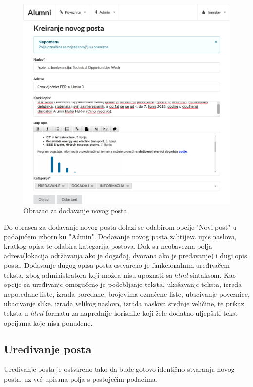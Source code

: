 \documentclass[zavrsni, numeric]{fer}
\begin{document}
\begin{figure}[H]
	\centering
	\includegraphics[width=13cm]{slike/novi-post.png}
	\caption{Obrazac za dodavanje novog posta}
	\label{fig:novi-post}
\end{figure}

Do obrasca za dodavanje novog posta dolazi se odabirom opcije "Novi post" u padajućem izborniku "Admin". Dodavanje novog posta zahtijeva upis naslova, kratkog opisa te odabira kategorija postova. Dok su neobavezna polja adresa(lokacija održavanja ako je događaj, dvorana ako je predavanje) i dugi opis posta. Dodavanje dugog opisa posta ostvareno je funkcionalnim uređivačem teksta, zbog administratora koji možda nisu upoznati sa \textit{html} sintaksom. Kao opcije za uređivanje omogućeno je podebljanje teksta, ukošavanje teksta, izrada neporedane liste, izrada poredane, brojevima označene liste, ubacivanje poveznice, ubacivanje slike, izrada velikog naslova, izrada naslova srednje veličine, te prikaz teksta u \textit{html} formatu za naprednije korisnike koji žele dodatno uljepšati tekst opcijama koje nisu ponuđene.

\subsection{Uređivanje posta}
Uređivanje posta je ostvareno tako da bude gotovo identično stvaranju novog posta, uz već upisana polja s postojećim podacima.
\end{document}
